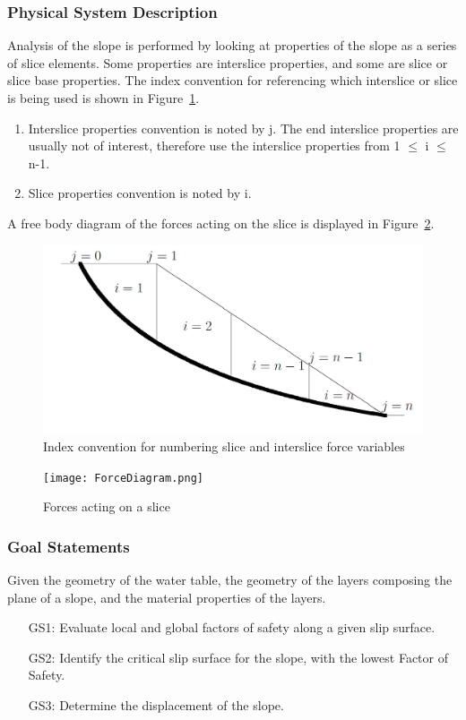 \documentclass[12pt]{article}
\begin{document}
\subsubsection{Physical System Description}
\label{Sec:PSD}
Analysis of the slope is performed by looking at properties of the slope as a series of slice elements. Some properties are interslice properties, and some are slice or slice base properties. The index convention for referencing which interslice or slice is being used is shown in Figure~\ref{Figure:Icfnsaifv}.
\begin{enumerate}
\item{Interslice properties convention is noted by j. The end interslice properties are usually not of interest, therefore use the interslice properties from 1 $\leq{}$ i $\leq{}$ n-1.}
\item{Slice properties convention is noted by i.}
\end{enumerate}
A free body diagram of the forces acting on the slice is displayed in Figure~\ref{Figure:Faoas}.
\begin{figure}
\begin{center}
\includegraphics{IndexConvention.png}
\caption{Index convention for numbering slice and interslice force variables}
\label{Figure:Icfnsaifv}
\end{center}
\end{figure}
\begin{figure}
\begin{center}
\texttt{[image: ForceDiagram.png]}
\caption{Forces acting on a slice}
\label{Figure:Faoas}
\end{center}
\end{figure}
\subsubsection{Goal Statements}
\label{Sec:GS}
Given the geometry of the water table, the geometry of the layers composing the plane of a slope, and the material properties of the layers.
\begin{itemize}
\item[GS1:]Evaluate local and global factors of safety along a given slip surface.
\item[GS2:]Identify the critical slip surface for the slope, with the lowest Factor of Safety.
\item[GS3:]Determine the displacement of the slope.
\end{itemize}
\end{document}
